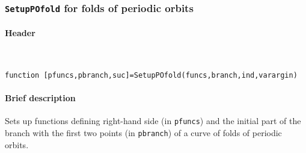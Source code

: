 \documentclass[11pt]{scrartcl}
\newcommand{\blist}[1]{\mbox{\lstinline!#1!}}
\begin{document}
\subsubsection{\blist{SetupPOfold} for folds of periodic orbits}
\label{fold}

\paragraph{Header}\
\begin{lstlisting}[basicstyle={\ttfamily\small}]
function [pfuncs,pbranch,suc]=SetupPOfold(funcs,branch,ind,varargin)
\end{lstlisting}

\paragraph{Brief description}
Sets up functions defining right-hand side (in \blist{pfuncs}) and the
initial part of the branch with the first two points (in
\blist{pbranch}) of a curve of folds of periodic orbits.
\end{document}
